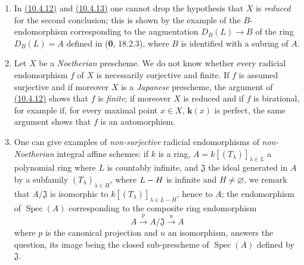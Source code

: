 \begin{remarks}[10.4.14]
\label{IV.10.4.14}
\begin{enumerate}[label=\textup{(\roman*)}]
\item In {\hyperref[IV.10.4.12]{(10.4.12)}} and
{\hyperref[IV.10.4.13]{(10.4.13)}} one cannot drop
the hypothesis that $X$ is \emph{reduced} for the second conclusion; this is
shown by the example of the $B$-endomorphism corresponding to the augmentation
$D_B(L)\to B$ of the ring $D_B(L)=A$ defined in (\textbf{0}, 18.2.3), where
$B$ is identified with a subring of $A$.

\item Let $X$ be a \emph{Noetherian} prescheme. We do not know whether every
radicial endomorphism $f$ of $X$ is necessarily surjective and finite.
If $f$ is assumed surjective and if moreover $X$ is a \emph{Japanese}
prescheme, the argument of
{\hyperref[IV.10.4.12]{(10.4.12)}} shows that $f$ is \emph{finite};
if moreover $X$ is reduced and if $f$ is birational, for example if,
for every maximal point $x\in X$, $\boldsymbol{k}(x)$ is perfect, the same
argument shows that $f$ is an automorphism.

\item One can give examples of \emph{non-surjective} radicial endomorphisms
of \emph{non-Noetherian} integral affine schemes: if $k$ is a
ring, $A=k[(T_\lambda)]_{\lambda\in L}$ a polynomial ring where $L$
is countably infinite, and $\mathfrak J$ the ideal generated in $A$ by
a subfamily $(T_\lambda)_{\lambda\in H}$, where $L- H$ is infinite and
$H\neq\varnothing$, we remark that $A/\mathfrak J$ is isomorphic to
$k[(T_\lambda)]_{\lambda\in L-H}$, hence to $A$; the endomorphism of
$\operatorname{Spec}(A)$ corresponding to the composite ring
endomorphism
\[
 A\xrightarrow{p}A/\mathfrak J\xrightarrow{u}A
\]
where $p$ is the canonical projection and $u$ an isomorphism, answers the
question, its image being the closed sub-prescheme of
$\operatorname{Spec}(A)$ defined by $\mathfrak J$.
\end{enumerate}
\end{remarks}

\EGAIVErrataThirtyTwoThroughFiftyThree

